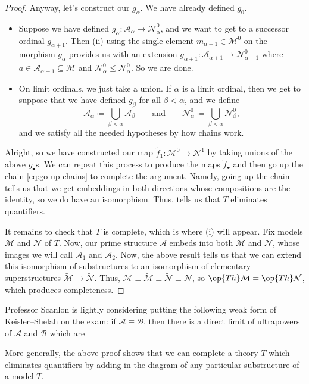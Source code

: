 \documentclass[../notes.tex]{subfiles}
\begin{document}
\begin{proof}
	Anyway, let's construct our $g_\alpha$. We have already defined $g_0$.
	\begin{itemize}
		\item Suppose we have defined $g_\alpha\colon\mathcal A_\alpha\to\mathcal N^0_\alpha$, and we want to get to a successor ordinal $g_{\alpha+1}$. Then (ii) using the single element $m_{\alpha+1}\in\mathcal M^0$ on the morphism $g_\alpha$ provides us with an extension $g_{\alpha+1}\colon\mathcal A_{\alpha+1}\to\mathcal N^0_{\alpha+1}$ where $a\in\mathcal A_{\alpha+1}\subseteq\mathcal M$ and $\mathcal N^0_\alpha\le\mathcal N^0_\alpha$. So we are done.
		\item On limit ordinals, we just take a union. If $\alpha$ is a limit ordinal, then we get to suppose that we have defined $g_\beta$ for all $\beta<\alpha$, and we define
		\[\mathcal A_\alpha\coloneqq\bigcup_{\beta<\alpha}\mathcal A_\beta\qquad\text{and}\qquad\mathcal N^0_\alpha\coloneqq\bigcup_{\beta<\alpha}\mathcal N^0_\beta,\]
		and we satisfy all the needed hypotheses by how chains work.
	\end{itemize}
	Alright, so we have constructed our map $\widetilde f_1\colon\mathcal M^0\to\mathcal N^1$ by taking unions of the above $g_\bullet$s. We can repeat this process to produce the maps $\widetilde f_\bullet$ and then go up the chain \eqref{eq:go-up-chains} to complete the argument. Namely, going up the chain tells us that we get embeddings in both directions whose compositions are the identity, so we do have an isomorphism. Thus,  tells us that $T$ eliminates quantifiers.

	It remains to check that $T$ is complete, which is where (i) will appear. Fix models $\mathcal M$ and $\mathcal N$ of $T$. Now, our prime structure $\mathcal A$ embeds into both $\mathcal M$ and $\mathcal N$, whose images we will call $\mathcal A_1$ and $\mathcal A_2$. Now, the above result tells us that we can extend this isomorphism of substructures to an isomorphism of elementary superstructures $\widetilde{\mathcal M}\to\widetilde{\mathcal N}$. Thus, $\mathcal M\equiv\widetilde{\mathcal M}\equiv\widetilde{\mathcal N}\equiv\mathcal N$, so $\op{Th}\mathcal M=\op{Th}\mathcal N$, which produces completeness.
\end{proof}
\begin{remark}
	Professor Scanlon is lightly considering putting the following weak form of Keisler--Shelah on the exam: if $\mathcal A\equiv\mathcal B$, then there is a direct limit of ultrapowers of $\mathcal A$ and $\mathcal B$ which are 
\end{remark}
\begin{remark}
	More generally, the above proof shows that we can complete a theory $T$ which eliminates quantifiers by adding in the diagram of any particular substructure of a model $T$.
\end{remark}
\end{document}
